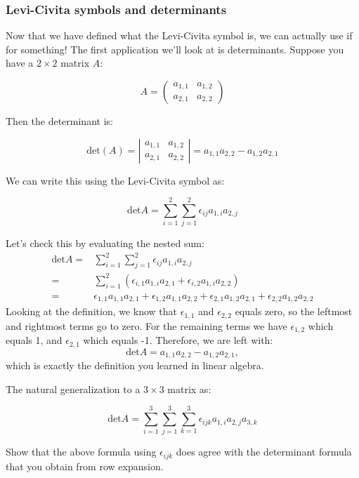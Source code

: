 \subsubsection*{Levi-Civita symbols and determinants} 
Now that we have defined what the Levi-Civita symbol is, we can actually use if for something!  The first application we'll look at is determinants.  Suppose you have a $2 \times 2 $ matrix $A$:

\[ A = \left( \begin{array}{cc}
a_{1,1} & a_{1,2} \\
a_{2,1} & a_{2,2} \end{array} \right) \]

Then the determinant is:

\[ \text{det} (A) = 
 \left| \begin{array}{cc} a_{1,1} & a_{1,2} \\
a_{2,1} & a_{2,2} \end{array} \right|
= a_{1,1}a_{2,2} - a_{1,2}a_{2,1} \]

We can write this using the Levi-Civita symbol as:

\[ \text{det} A = \sum_{i=1}^2 \sum_{j=1}^2 \epsilon_{ij} a_{1,i} a_{2,j} \]

Let's check this by evaluating the nested sum:
\begin{align}
\text{det} A =& \sum_{i=1}^2 \sum_{j=1}^2 \epsilon_{ij} a_{1,i} a_{2,j} \\
=& \sum_{i=1}^2 \left( \epsilon_{i,1} a_{1,i} a_{2,1} + \epsilon_{i,2} a_{1,i} a_{2,2} \right) \\
=& \epsilon_{1,1} a_{1,1} a_{2,1} + \epsilon_{1,2} a_{1,1} a_{2,2} + \epsilon_{2,1} a_{1,2} a_{2,1} + \epsilon_{2,2} a_{1,2} a_{2,2}
\end{align}
Looking at the definition, we know that $\epsilon_{1,1}$ and $\epsilon_{2,2}$ equals zero, so the leftmost and rightmost terms go to zero.   For the remaining terms we have $\epsilon_{1,2}$ which equals 1, and $\epsilon_{2,1}$ which equals -1.  Therefore, we are left with:
\[ \text{det} A = a_{1,1}a_{2,2} - a_{1,2}a_{2,1}, \]
which is exactly the definition you learned in linear algebra.   

The natural generalization to a $3 \times 3$ matrix as:

\[ \text{det} A = \sum_{i=1}^3 \sum_{j=1}^3 \sum_{k=1}^3 \epsilon_{ijk} a_{1,i} a_{2,j} a_{3,k} \]

\begin{exercise}
Show that the above formula using $\epsilon_{ijk}$ does agree with the determinant formula that you obtain from row expansion.
\end{exercise}

